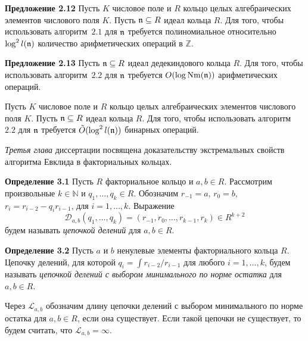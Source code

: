 \documentclass[_00_autoref.tex]{subfiles}
\begin{document}
\textbf{Предложение 2.12}
    Пусть $K$ числовое поле и $R$ кольцо целых алгебраических элементов числового поля $K$.
    Пусть $\mathfrak{n} \subseteq R$ идеал кольца $R$.
    Для того, чтобы использовать алгоритм~$2.1$ для $\mathfrak{n}$ требуется полиномиальное относительно $\log^2 l(\mathfrak{n})$ количество арифметических операций в $\mathbb{Z}$.

\textbf{Предложение 2.13}
    Пусть $\mathfrak{n} \subseteq R$ идеал дедекиндового кольца $R$.
    Для того, чтобы использовать алгоритм~$2.2$ для $\mathfrak{n}$ требуется $O(\log \textrm{Nm}(\mathfrak{n}))$ арифметических операций.

    Пусть $K$ числовое поле и $R$ кольцо целых алгебраических элементов числового поля $K$.
    Пусть $\mathfrak{n} \subseteq R$ идеал кольца $R$.
    Для того, чтобы использовать алгоритм~$2.2$ для $\mathfrak{n}$ требуется $\tilde{O}(\log^2 l(\mathfrak{n}))$ бинарных операций.


\emph{Третья глава} диссертации посвящена доказательству экстремальных свойств алгоритма Евклида в факториальных кольцах.

\textbf{Определение 3.1}
    Пусть $R$ факториальное кольцо и $a, b \in R$.
    Рассмотрим произвольные $k \in \mathbb{N}$ и $q_1, \dots, q_k \in R$.
    Обозначим $r_{-1} = a$, $r_0 = b$, $r_i = r_{i-2} - q_i r_{i-1}$, для $i = 1, \dots, k$.
    Выражение
    \begin{equation*}
        \mathcal{D}_{a, b}(q_1, \dots, q_k) = (r_{-1}, r_0, \dots, r_{k-1}, r_k) \in R^{k+2}
    \end{equation*}
    будем называть \emph{цепочкой делений} для $a, b \in R$.

\textbf{Определение 3.2}
    Пусть $a$ и $b$ ненулевые элементы факториального кольца $R$.
    Цепочку делений, для которой $q_i = \int{r_{i-2}/r_{i-1}}$ для любого $i = 1, \dots, k$, будем называть \emph{цепочкой делений с выбором минимального по норме остатка} для $a, b \in R$.

    Через $\mathcal{L}_{a, b}$ обозначим длину цепочки делений с выбором минимального по норме остатка для $a, b \in R$, если она существует.
    Если такой цепочки не существует, то будем считать, что $\mathcal{L}_{a, b} = \infty$.
\end{document}
